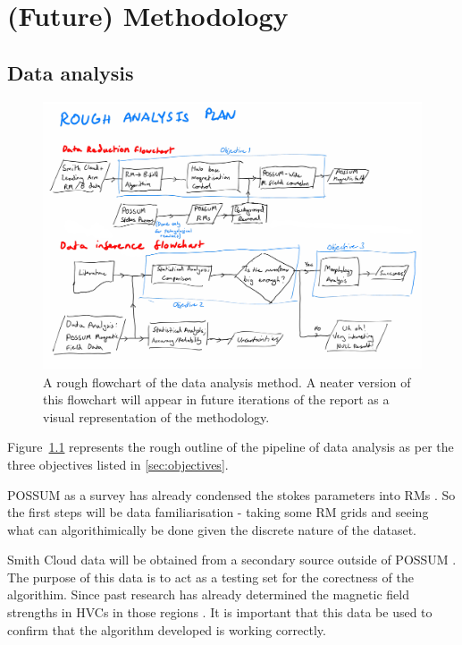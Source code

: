 \chapter{(Future) Methodology}
\label{cha:methodology}

\section{Data analysis}
\label{sec:method}

\begin{figure}[h]
  \label{fig:flowchart}
  \includegraphics[width=\columnwidth]{figs/flowchart.png}
  \caption{A rough flowchart of the data analysis method. A neater version of this flowchart will appear in future iterations of the report as a visual representation of the methodology.}
\end{figure}

Figure~\ref{fig:flowchart} represents the rough outline of the pipeline of data analysis as per the three objectives listed in \ref{sec:objectives}.

POSSUM as a survey has already condensed the stokes parameters into RMs \cite{ID1}. So the first steps will be data familiarisation - taking some RM grids and seeing what can algorithimically be done given the discrete nature of the dataset.

Smith Cloud data will be obtained from a secondary source outside of POSSUM \cite{ID18, ID26, ID28}. The purpose of this data is to act as a testing set for the corectness of the algorithim. Since past research has already determined the magnetic field strengths in HVCs in those regions \cite{ID26}. It is important that this data be used to confirm that the algorithm developed is working correctly.

